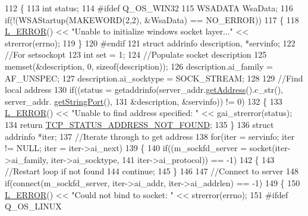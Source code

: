 \begin{DoxyCode}
112 \{
113     \textcolor{keywordtype}{int} status;
114 \textcolor{preprocessor}{#ifdef Q\_OS\_WIN32}
115 \textcolor{preprocessor}{}    WSADATA WsaData;
116     \textcolor{keywordflow}{if}(!(WSAStartup(MAKEWORD(2,2), &WsaData) == NO\_ERROR))
117     \{
118         \hyperlink{Log_8h_a1a242c34c5066fb0c62d909f22d3716d}{L\_ERROR}() << \textcolor{stringliteral}{"Unable to initialize windows socket layer..."} << strerror(errno);
119     \}
120 \textcolor{preprocessor}{#endif}
121 \textcolor{preprocessor}{}    \textcolor{keyword}{struct }addrinfo description, *servinfo;
122     \textcolor{comment}{//For setsockopt}
123     \textcolor{keywordtype}{int} set = 1;
124     \textcolor{comment}{//Populate socket description}
125     memset(&description, 0, \textcolor{keyword}{sizeof}(description));
126     description.ai\_family = AF\_UNSPEC;
127     description.ai\_socktype = SOCK\_STREAM;
128 
129     \textcolor{comment}{//Find local address}
130     \textcolor{keywordflow}{if}((status = getaddrinfo(server\_addr.\hyperlink{classAddress_aa84d076d4adf5cac8381146fcf261af7}{getAddress}().c\_str(), server\_addr.
      \hyperlink{classAddress_a7e29bafabaff50823ac432f74e5232be}{getStringPort}(),
131                              &description, &servinfo)) != 0)
132     \{
133         \hyperlink{Log_8h_a1a242c34c5066fb0c62d909f22d3716d}{L\_ERROR}() << \textcolor{stringliteral}{"Unable to find address specified: "} << gai\_strerror(status);
134         \textcolor{keywordflow}{return} \hyperlink{tcpclient_8h_ab36b81f0daebbad95a533ea9951ee569a677e05a70195600d99f343ac4d080f12}{TCP\_STATUS\_ADDRESS\_NOT\_FOUND};
135     \}
136     \textcolor{keyword}{struct }addrinfo *iter;
137     \textcolor{comment}{//Iterate through to get address}
138     \textcolor{keywordflow}{for}(iter = servinfo; iter != NULL; iter = iter->ai\_next)
139     \{
140         \textcolor{keywordflow}{if}((m\_sockfd\_server = socket(iter->ai\_family, iter->ai\_socktype,
141                                     iter->ai\_protocol)) == -1)
142         \{
143             \textcolor{comment}{//Restart loop if not found}
144             \textcolor{keywordflow}{continue};
145         \}
146 
147         \textcolor{comment}{//Connect to server}
148         \textcolor{keywordflow}{if}(connect(m\_sockfd\_server, iter->ai\_addr, iter->ai\_addrlen) == -1)
149         \{
150             \hyperlink{Log_8h_a1a242c34c5066fb0c62d909f22d3716d}{L\_ERROR}() << \textcolor{stringliteral}{"Could not bind to socket: "} << strerror(errno);
151 \textcolor{preprocessor}{#ifdef Q\_OS\_LINUX}

\end{DoxyCode}
